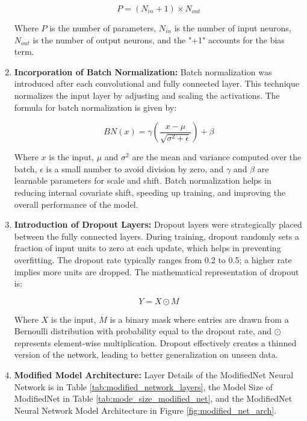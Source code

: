 \documentclass[conference]{IEEEtran}
\begin{document}
\begin{enumerate}
		\begin{equation}
			P = (N_{in} + 1) \times N_{out}
		\end{equation}
		
		Where \(P\) is the number of parameters, \(N_{in}\) is the number of input neurons, \(N_{out}\) is the number of output neurons, and the "+1" accounts for the bias term.
		
		\item \textbf{Incorporation of Batch Normalization:}
		Batch normalization was introduced after each convolutional and fully connected layer. This technique normalizes the input layer by adjusting and scaling the activations. The formula for batch normalization is given by:
		
		\begin{equation}
			BN(x) = \gamma \left( \frac{x - \mu}{\sqrt{\sigma^2 + \epsilon}} \right) + \beta
		\end{equation}
		
		Where \(x\) is the input, \(\mu\) and \(\sigma^2\) are the mean and variance computed over the batch, \(\epsilon\) is a small number to avoid division by zero, and \(\gamma\) and \(\beta\) are learnable parameters for scale and shift. Batch normalization helps in reducing internal covariate shift, speeding up training, and improving the overall performance of the model.
		
		\item \textbf{Introduction of Dropout Layers:}
		Dropout layers were strategically placed between the fully connected layers. During training, dropout randomly sets a fraction of input units to zero at each update, which helps in preventing overfitting. The dropout rate typically ranges from 0.2 to 0.5; a higher rate implies more units are dropped. The mathematical representation of dropout is:
		
		\begin{equation}
			Y = X \odot M
		\end{equation}
		
		Where \(X\) is the input, \(M\) is a binary mask where entries are drawn from a Bernoulli distribution with probability equal to the dropout rate, and \(\odot\) represents element-wise multiplication. Dropout effectively creates a thinned version of the network, leading to better generalization on unseen data.
		
		\item \textbf{Modified Model Architecture:}
		Layer Details of the ModifiedNet Neural Network is in Table \ref{tab:modified_network_layers}, the Model Size of ModifiedNet in Table \ref{tab:mode_size_modified_net}, and the ModifiedNet Neural Network Model Architecture in Figure \ref{fig:modified_net_arch}.
		

\end{enumerate}
\end{document}
